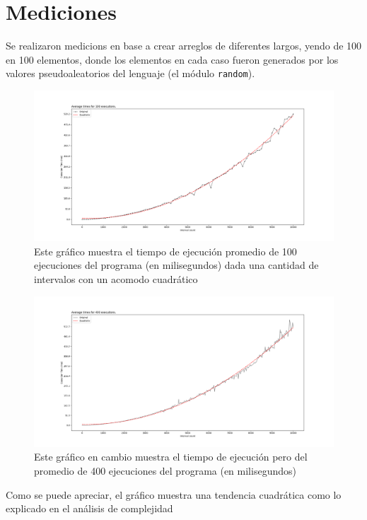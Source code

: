 \section{Mediciones}

Se realizaron medicions en base a crear arreglos de diferentes largos, yendo de 100 en 100 elementos, donde los elementos en cada caso fueron generados por los valores pseudoaleatorios del lenguaje (el módulo \texttt{random}). 

\begin{figure}[H]
    \centering
    \includegraphics[width=1\textwidth]{../images/graphic_100Intervals.png}
    Este gráfico muestra el tiempo de ejecución promedio de 100 ejecuciones del programa (en milisegundos) dada una cantidad de intervalos con un acomodo cuadrático
\end{figure}

\begin{figure}[H]
	\centering
	\includegraphics[width=1\textwidth]{../images/graphic_400Intervals.png}
	Este gráfico en cambio muestra el tiempo de ejecución pero del promedio de 400 ejecuciones del programa (en milisegundos)
\end{figure}

Como se puede apreciar, el gráfico muestra una tendencia cuadrática como lo explicado en el análisis de complejidad

